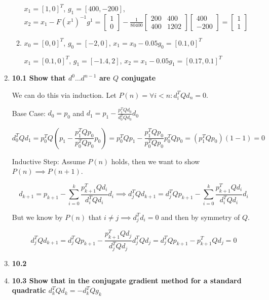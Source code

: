 \documentclass[10pt,a4paper]{article}
\begin{document}
\begin{enumerate}
\begin{enumerate}
        $x_1 = [1, 0]^T$, $g_1 = [400, -200]$, $x_2 = x_1 - F(x^1)^{-1} g^1  = \begin{bmatrix} 1\\ 0 \end{bmatrix} - \frac{1}{80400} \begin{bmatrix} 200 & 400 \\ 400 & 1202 \end{bmatrix} \begin{bmatrix} 400 \\ -200 \end{bmatrix} = \begin{bmatrix}1 \\1 \end{bmatrix}$
        \item $x_0 = [0, 0]^T$, $g_0 = [-2, 0]$, $x_1 = x_0 - 0.05 g_0 = [0.1, 0]^T$

        $x_1 = [0.1, 0]^T$, $g_1 = [-1.4, 2]$, $x_2 = x_1 - 0.05 g_1 = [0.17, 0.1]^T$

    \end{enumerate}

    \item \textbf{10.1 Show that $d^0 \dots d^{n-1}$ are $Q$ conjugate}
    
    We can do this via induction. Let $P(n) = \forall i < n : d_{i}^TQd_n = 0$.
   
    Base Case: $d_0 = p_0$ and $d_1 = p_1 - \frac{p_1^TQd_0}{d_0^TQd_0}d_0$

    $$d_0^TQd_1 = p_0^TQ(p_1 - \frac{p_1^TQp_0}{p_0^TQp_0}p_0) = p_0^TQp_1 - \frac{p_1^TQp_0}{p_0^TQp_0}p_0^TQp_0 = (p_1^TQp_0) (1-1) = 0$$

    Inductive Step: Assume $P(n)$ holds, then we want to show $P(n) \implies P(n+1)$.

    $$d_{k+1} = p_{k+1} - \sum_{i=0}^k \frac{p_{k+1}^TQd_i}{d_i^TQd_i}d_i \implies d_j^TQd_{k+1} = d_j^TQp_{k+1} - \sum_{i=0}^k \frac{p_{k+1}^TQd_i}{d_i^TQd_i}d_i$$

    But we know by $P(n)$ that $ i \neq j \implies d_j^Td_i = 0$ and then by symmetry of $Q$.

    $$d_j^TQd_{k+1} = d_j^TQp_{k+1} - \frac{p_{k+1}^TQd_j}{d_j^TQd_j}d_j^TQd_j = d_j^TQp_{k+1} - p_{k+1}^TQd_j = 0$$


    \item \textbf{10.2 }
    \item \textbf{10.3 Show that in the conjugate gradient method for a standard quadratic $d_k^TQd_k = - d_k^TQg_k$}
    

\end{enumerate}
\end{document}
